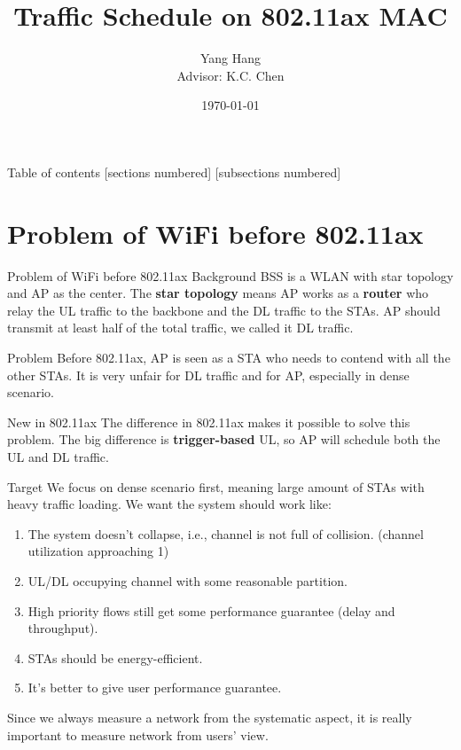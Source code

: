 \documentclass[10pt]{beamer}
\title{Traffic Schedule on 802.11ax MAC}
\date{\today}
\author{Yang Hang \\ Advisor: K.C. Chen}
\institute{Gratitude Institute of Communication Engineering }
\begin{document}
\maketitle
\begin{frame}{Table of contents}
	[sections numbered]
    [subsections numbered]
\setcounter{tocdepth}{5}
\setcounter{secnumdepth}{5} 
    \tableofcontents%
\end{frame}

\section{Problem of WiFi before 802.11ax}
\begin{frame}{Problem of WiFi before 802.11ax}
\alert{Background}
BSS is a WLAN with star topology and AP as the center. 
The \textbf{star topology} means AP works as a \textbf{router} who relay the UL traffic to the backbone and the DL traffic to the STAs. 
AP should transmit at least half of the total traffic, we called it DL traffic. 

\alert{Problem} 
Before 802.11ax, AP is seen as a STA who needs to contend with all the other STAs. It is very unfair for DL traffic and for AP, especially in dense scenario. 

\alert{New in 802.11ax}
The difference in 802.11ax makes it possible to solve this problem. 
The big difference is \textbf{trigger-based} UL, so AP will schedule both the UL and DL traffic. 
\end{frame}

\begin{frame}{Target}
We focus on dense scenario first, meaning large amount of STAs with heavy traffic loading. 
We want the system should work like:
\begin{enumerate}
	\item The system doesn't collapse, i.e., channel is not full of collision. (channel utilization approaching 1)
 	\item UL/DL occupying channel with some reasonable partition.
	\item High priority flows still get some performance guarantee (delay and throughput). 
	\item STAs should be energy-efficient.
	\item It's better to give user performance guarantee.
\end{enumerate} 
Since we always measure a network from the systematic aspect, it is really important to measure network from users' view.
\end{frame}
\end{document}

